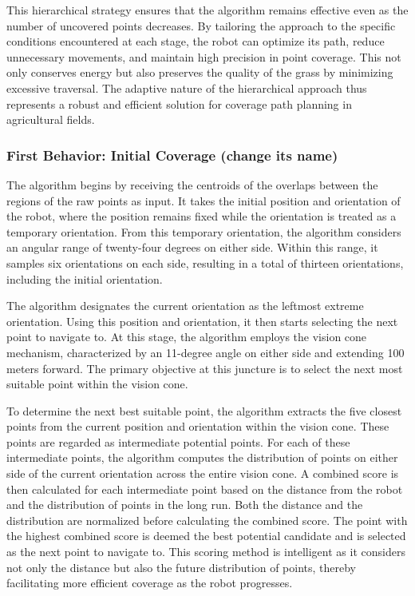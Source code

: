 \vspace*{6mm}   


This hierarchical strategy ensures that the algorithm remains effective even as the number of uncovered points decreases. By tailoring the approach to the specific conditions encountered at each stage, the robot can optimize its path, reduce unnecessary movements, and maintain high precision in point coverage. This not only conserves energy but also preserves the quality of the grass by minimizing excessive traversal. The adaptive nature of the hierarchical approach thus represents a robust and efficient solution for coverage path planning in agricultural fields. 

\vspace*{6mm}  





\subsubsection{First Behavior: Initial Coverage (change its name)}


The algorithm begins by receiving the centroids of the overlaps between the regions of the raw points as input. It takes the initial position and orientation of the robot, where the position remains fixed while the orientation is treated as a temporary orientation. From this temporary orientation, the algorithm considers an angular range of twenty-four degrees on either side. Within this range, it samples six orientations on each side, resulting in a total of thirteen orientations, including the initial orientation. 

\vspace*{6mm}   

The algorithm designates the current orientation as the leftmost extreme orientation. Using this position and orientation, it then starts selecting the next point to navigate to. At this stage, the algorithm employs the vision cone mechanism, characterized by an 11-degree angle on either side and extending 100 meters forward. The primary objective at this juncture is to select the next most suitable point within the vision cone.

\vspace*{6mm}  

To determine the next best suitable point, the algorithm extracts the five closest points from the current position and orientation within the vision cone. These points are regarded as intermediate potential points. For each of these intermediate points, the algorithm computes the distribution of points on either side of the current orientation across the entire vision cone. A combined score is then calculated for each intermediate point based on the distance from the robot and the distribution of points in the long run. Both the distance and the distribution are normalized before calculating the combined score. The point with the highest combined score is deemed the best potential candidate and is selected as the next point to navigate to. This scoring method is intelligent as it considers not only the distance but also the future distribution of points, thereby facilitating more efficient coverage as the robot progresses.

